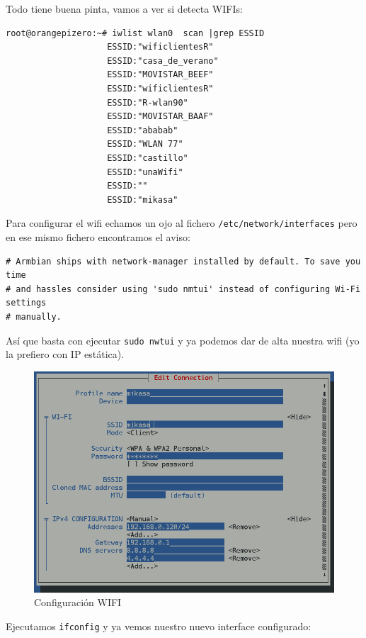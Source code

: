 \documentclass[12pt,spanish,]{scrartcl}
\begin{document}
Todo tiene buena pinta, vamos a ver si detecta WIFIs:

\begin{verbatim}
root@orangepizero:~# iwlist wlan0  scan |grep ESSID
                    ESSID:"wificlientesR"
                    ESSID:"casa_de_verano"
                    ESSID:"MOVISTAR_BEEF"
                    ESSID:"wificlientesR"
                    ESSID:"R-wlan90"
                    ESSID:"MOVISTAR_BAAF"
                    ESSID:"ababab"
                    ESSID:"WLAN 77"
                    ESSID:"castillo"
                    ESSID:"unaWifi"
                    ESSID:""
                    ESSID:"mikasa"
\end{verbatim}

Para configurar el wifi echamos un ojo al fichero
\texttt{/etc/network/interfaces} pero en ese mismo fichero encontramos
el aviso:

\begin{verbatim}
# Armbian ships with network-manager installed by default. To save you time
# and hassles consider using 'sudo nmtui' instead of configuring Wi-Fi settings
# manually.
\end{verbatim}

Así que basta con ejecutar \texttt{sudo\ nwtui} y ya podemos dar de alta
nuestra wifi (yo la prefiero con IP estática).

\begin{figure}[htbp]
\centering
\includegraphics{src/img/OrangePiZero_tmtui.png}
\caption{Configuración WIFI}
\end{figure}

Ejecutamos \texttt{ifconfig} y ya vemos nuestro nuevo interface
configurado:
\end{document}
